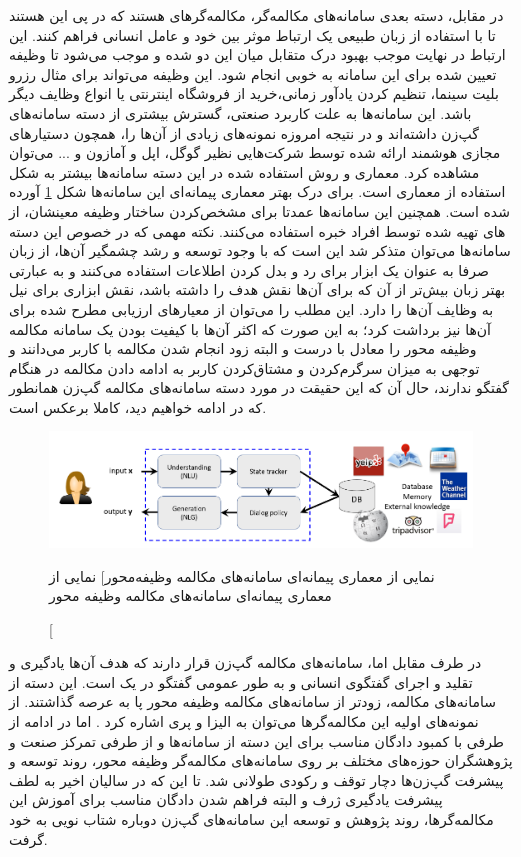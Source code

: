 در مقابل، دسته بعدی سامانه‌های مکالمه‌گر،‌ مکالمه‌گر‌های 
 هستند که در پی این هستند تا با استفاده از زبان طبیعی یک ارتباط موثر بین خود و عامل انسانی فراهم کنند. این ارتباط در نهایت موجب بهبود درک متقابل میان این دو شده و موجب می‌شود تا وظیفه تعیین شده
برای این سامانه به خوبی انجام شود.
این وظیفه می‌تواند برای مثال رزرو بلیت سینما، تنظیم کردن یاد‌آور زمانی،‌خرید از فروشگاه اینترنتی یا انواع وظایف دیگر باشد.
این سامانه‌ها به علت کاربرد صنعتی، گسترش بیشتری از دسته سامانه‌های گپ‌زن داشته‌اند و در نتیجه امروزه نمونه‌های زیادی از آن‌‌ها را، همچون دستیارهای مجازی هوشمند ارائه شده توسط شرکت‌هایی نظیر گوگل، اپل	 و آمازون و ... می‌توان مشاهده کرد. معماری و روش استفاده شده در این دسته سامانه‌ها بیشتر به شکل استفاده از معماری 
است. 
برای درک بهتر معماری پیمانه‌ای این سامانه‌ها شکل 
\ref{fig:chap1s:modular}
آورده شده است.
همچنین این سامانه‌ها عمدتا برای مشخص‌کردن ساختار وظیفه معینشان، از 
 های تهیه شده توسط افراد خبره استفاده می‌کنند.
نکته مهمی که در خصوص این دسته‌ سامانه‌ها می‌توان متذکر شد این است که با وجود توسعه و رشد چشمگیر آن‌ها، از زبان صرفا به عنوان یک ابزار برای رد و بدل کردن اطلاعات استفاده می‌کنند و به عبارتی بهتر زبان بیش‌تر از آن‌ که برای آن‌ها نقش هدف را داشته باشد، نقش ابزاری برای نیل به وظایف آن‌ها را دارد. این مطلب را می‌توان از معیارهای ارزیابی مطرح شده برای آن‌ها نیز برداشت کرد؛ به این صورت که اکثر آن‌ها با کیفیت بودن یک سامانه مکالمه وظیفه محور را معادل با درست و البته زود انجام شدن مکالمه با کاربر می‌دانند و توجهی به میزان سرگرم‌کردن و مشتاق‌کردن کاربر به ادامه دادن مکالمه در هنگام گفتگو ندارند، حال آن که این حقیقت در مورد دسته‌ سامانه‌های مکالمه گپ‌زن همانطور که در ادامه خواهیم دید، کاملا برعکس است.

\begin{figure}[h]
	\centering
	\includegraphics[width=1\textwidth]{images/chap1/modular.png}
	\caption
	[نمایی از معماری پیمانه‌ای سامانه‌های مکالمه وظیفه‌محور]
	{
		نمایی از معماری‌ پیمانه‌ای سامانه‌های مکالمه وظیفه محور
		\cite{Gao_Neural_Approaches}
	}
	\label{fig:chap1s:modular}
\end{figure}


در طرف مقابل اما، سامانه‌های مکالمه گپ‌زن قرار دارند که هدف آن‌ها یادگیری و تقلید و اجرای گفتگوی انسانی و به طور عمومی گفتگو در یک
است.
این دسته از سامانه‌های مکالمه، زودتر از سامانه‌های مکالمه وظیفه محور پا به عرصه گذاشتند.
از نمونه‌های اولیه این مکالمه‌گر‌ها می‌توان به الیزا و پری اشاره کرد
\cite{weizenbaum1966eliza, parry}
.
اما در ادامه از طرفی با کمبود دادگان مناسب برای این دسته از سامانه‌ها و از طرفی تمرکز صنعت و پژوهشگران حوزه‌های مختلف بر روی سامانه‌های مکالمه‌گر وظیفه محور، روند توسعه و پیشرفت گپ‌زن‌ها دچار توقف و رکودی طولانی شد. تا این که در سالیان اخیر به لطف پیشرفت یادگیری ژرف و البته فراهم‌ شدن دادگان مناسب برای آموزش این مکالمه‌گر‌ها، روند پژوهش و توسعه این سامانه‌های گپ‌زن دوباره شتاب نویی به خود گرفت.

